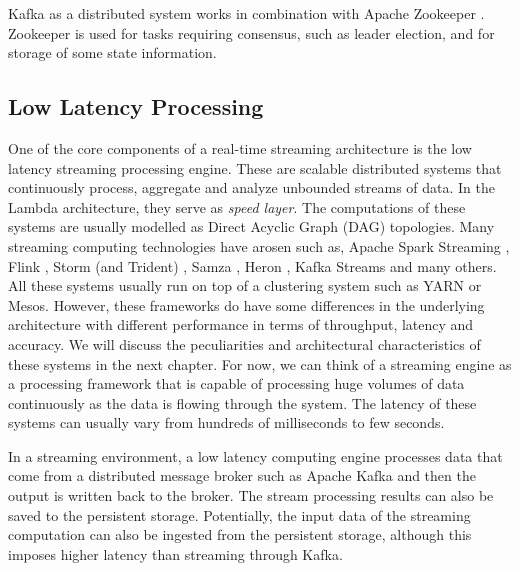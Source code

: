 Kafka as a distributed system works in combination with Apache Zookeeper \cite{apachezookeeperonline}. Zookeeper is used for tasks requiring consensus, such as leader election, and for storage of some state information.




\subsection{Low Latency Processing}
One of the core components of a real-time streaming architecture is the low latency streaming processing engine. These are scalable distributed systems that continuously process, aggregate and analyze unbounded streams of data. In the Lambda architecture, they serve as \emph{speed layer}. The computations of these systems are usually modelled as Direct Acyclic Graph (DAG) topologies. Many streaming computing technologies have arosen such as, Apache Spark Streaming \cite{apachesparkstreamingonline}, Flink \cite{apacheflinkonline}, Storm (and Trident) \cite{apachestormonline}, Samza \cite{apachesamzaonline}, Heron \cite{herononline}, Kafka Streams \cite{kafkastreamsonline} and many others. All these systems usually run on top of a clustering system such as YARN or Mesos. However, these frameworks do have some differences in the underlying architecture with different performance in terms of throughput, latency and accuracy. We will discuss the peculiarities and architectural characteristics of these systems in the next chapter. For now, we can think of a streaming engine as a processing framework that is capable of processing huge volumes of data continuously as the data is flowing through the system. The latency of these systems can usually vary from hundreds of milliseconds to few seconds. 

In a streaming environment, a low latency computing engine processes data that come from a distributed message broker such as Apache Kafka and then the output is written back to the broker. The stream processing results can also be saved to the persistent storage. Potentially, the input data of the streaming computation can also be ingested from the persistent storage, although this imposes higher latency than streaming through Kafka.

